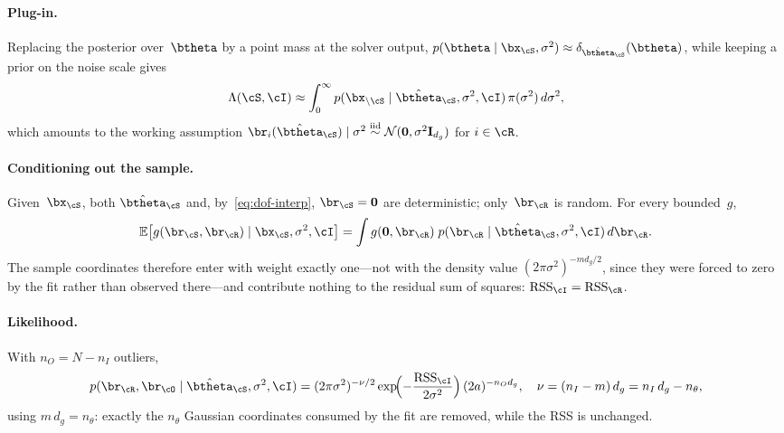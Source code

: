 \paragraph{Plug-in.}
Replacing the posterior over~$\btheta$ by a point mass at the solver
output, $p(\btheta \mid \bx_\cS, \sigma^2) \approx
\delta_{\hat\btheta_\cS}(\btheta)$, while keeping a prior on the noise
scale gives
\begin{equation}
	\Lambda(\cS, \cI) \approx \int_0^\infty
	p(\bx_{\setminus\cS} \mid \hat\btheta_\cS, \sigma^2, \cI)\,
	\pi(\sigma^2)\, d\sigma^2,
	\label{eq:dof-plugin}
\end{equation}
which amounts to the working assumption
$\br_i(\hat\btheta_\cS) \mid \sigma^2 \overset{\text{iid}}{\sim}
\mathcal{N}(\bzero, \sigma^2 \mathbf{I}_{d_g})$ for $i \in \cR$.

\paragraph{Conditioning out the sample.}
Given~$\bx_\cS$, both $\hat\btheta_\cS$ and, by~\eqref{eq:dof-interp},
$\br_\cS = \bzero$ are deterministic; only~$\br_\cR$ is random.  For
every bounded~$g$,
\begin{equation}
	\mathbb{E}\bigl[g(\br_\cS, \br_\cR) \mid \bx_\cS, \sigma^2, \cI\bigr]
	= \int g(\bzero, \br_\cR)\;
	p(\br_\cR \mid \hat\btheta_\cS, \sigma^2, \cI)\, d\br_\cR .
	\label{eq:dof-condition}
\end{equation}
The sample coordinates therefore enter with weight exactly one---not
with the density value $(2\pi\sigma^2)^{-m d_g/2}$, since they were
forced to zero by the fit rather than observed there---and contribute
nothing to the residual sum of squares: $\RSS_\cI = \RSS_\cR$.

\paragraph{Likelihood.}
With $n_O = N - n_I$ outliers,
\begin{equation}
	p(\br_\cR, \br_\cO \mid \hat\btheta_\cS, \sigma^2, \cI)
	= (2\pi\sigma^2)^{-\nu/2}
	\exp\!\Bigl({-}\frac{\RSS_\cI}{2\sigma^2}\Bigr)\,
	(2a)^{-n_O d_g},
	\quad
	\nu = (n_I - m)\,d_g = n_I\,d_g - n_\theta,
	\label{eq:dof-likelihood}
\end{equation}
using $m\,d_g = n_\theta$: exactly the $n_\theta$ Gaussian
coordinates consumed by the fit are removed, while the RSS is
unchanged.

